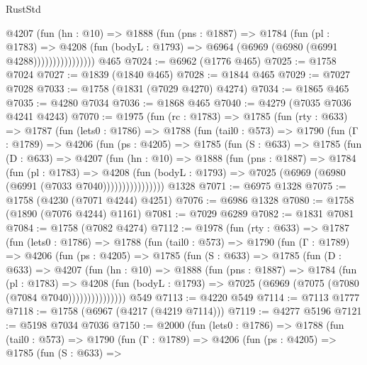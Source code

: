 \begin{lexlean}{RustStd}
\begin{coremodule}
{\begin{coremodule}
{{{{{{{{{{{{{{{                    @4207
                      (fun (hn : @10) =>
                      @1888
                        (fun (pns : @1887) =>
                        @1784
                          (fun (pl : @1783) =>
                          @4208
                            (fun (bodyL : @1793) => @6964 (@6969 (@6980 (@6991 @4288))))))))))))))))
    @465
@7024 := @6962 (@1776 @465)
@7025 := @1758 @7024
@7027 := @1839 (@1840 @465)
@7028 := @1844 @465
@7029 := @7027 @7028
@7033 := @1758 (@1831 (@7029 @4270) @4274)
@7034 := @1865 @465
@7035 := @4280 @7034
@7036 := @1868 @465
@7040 := @4279 (@7035 @7036 @4241 @4243)
@7070 := @1975
    (fun (rc : @1783) =>
    @1785
      (fun (rty : @633) =>
      @1787
        (fun (lets0 : @1786) =>
        @1788
          (fun (tail0 : @573) =>
          @1790
            (fun (Γ : @1789) =>
            @4206
              (fun (ps : @4205) =>
              @1785
                (fun (S : @633) =>
                @1785
                  (fun (D : @633) =>
                  @4207
                    (fun (hn : @10) =>
                    @1888
                      (fun (pns : @1887) =>
                      @1784
                        (fun (pl : @1783) =>
                        @4208
                          (fun (bodyL : @1793) =>
                          @7025 (@6969 (@6980 (@6991 (@7033 @7040))))))))))))))))
    @1328
@7071 := @6975 @1328
@7075 := @1758 (@4230 (@7071 @4244) @4251)
@7076 := @6986 @1328
@7080 := @1758 (@1890 (@7076 @4244) @1161)
@7081 := @7029 @6289
@7082 := @1831 @7081
@7084 := @1758 (@7082 @4274)
@7112 := @1978
    (fun (rty : @633) =>
    @1787
      (fun (lets0 : @1786) =>
      @1788
        (fun (tail0 : @573) =>
        @1790
          (fun (Γ : @1789) =>
          @4206
            (fun (ps : @4205) =>
            @1785
              (fun (S : @633) =>
              @1785
                (fun (D : @633) =>
                @4207
                  (fun (hn : @10) =>
                  @1888
                    (fun (pns : @1887) =>
                    @1784
                      (fun (pl : @1783) =>
                      @4208
                        (fun (bodyL : @1793) =>
                        @7025 (@6969 (@7075 (@7080 (@7084 @7040)))))))))))))))
    @549
@7113 := @4220 @549
@7114 := @7113 @1777
@7118 := @1758 (@6967 (@4217 (@4219 @7114)))
@7119 := @4277 @5196
@7121 := @5198 @7034 @7036
@7150 := @2000
    (fun (lets0 : @1786) =>
    @1788
      (fun (tail0 : @573) =>
      @1790
        (fun (Γ : @1789) =>
        @4206
          (fun (ps : @4205) =>
          @1785
            (fun (S : @633) =>
}}}}}}}}}}}}}}}
\end{coremodule}}
\end{coremodule}
\end{lexlean}
